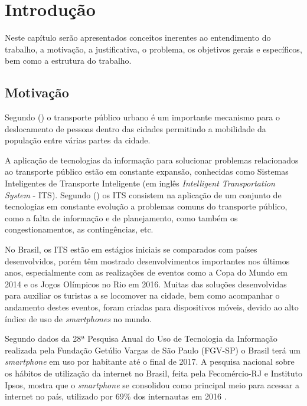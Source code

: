 \chapter{Introdução}

Neste capítulo serão apresentados conceitos inerentes ao entendimento do trabalho, a motivação, a justificativa, o problema, os objetivos gerais e específicos, bem como a estrutura do trabalho.

\section{Motivação}

Segundo \citeauthor{nascimento-lima} (\citeyear{nascimento-lima}) o transporte público urbano é um importante mecanismo para o deslocamento de pessoas dentro das cidades permitindo a mobilidade da população entre várias partes da cidade.

A aplicação de tecnologias da informação para solucionar problemas relacionados ao transporte público estão em constante expansão, conhecidas como Sistemas Inteligentes de Transporte Inteligente (em inglês \textit{Intelligent Transportation System} - ITS). Segundo \citeauthor{associacao-nacional} (\citeyear{associacao-nacional}) os ITS consistem na aplicação de um conjunto de tecnologias em constante evolução a problemas comuns do transporte público, como a falta de informação e de planejamento, como também os congestionamentos, as contingências, etc. 

No Brasil, os ITS estão em estágios iniciais se comparados com países desenvolvidos, porém têm mostrado desenvolvimentos importantes nos últimos anos, especialmente com as realizações de eventos como a Copa do Mundo em 2014 e os Jogos Olímpicos no Rio em 2016\cite{alvarado-campos}. Muitas das soluções desenvolvidas para auxiliar os turistas a se locomover na cidade, bem como acompanhar o andamento destes eventos, foram criadas para dispositivos móveis, devido ao alto índice de uso de \textit{smartphones} no mundo.

Segundo dados da 28ª Pesquisa Anual do Uso de Tecnologia da Informação realizada pela Fundação Getúlio Vargas de São Paulo (FGV-SP) o Brasil terá um \textit{smartphone} em uso por habitante até o final de 2017. A pesquisa nacional sobre os hábitos de utilização da internet no Brasil, feita pela Fecomércio-RJ e Instituto Ipsos, mostra que o \textit{smartphone} se consolidou como principal meio para acessar a internet no país, utilizado por 69\% dos internautas em 2016 \cite{agencia-brasil}.

